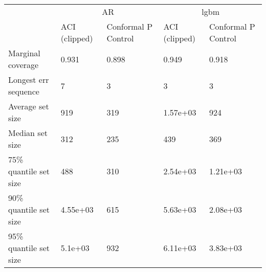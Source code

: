 \begin{tabular}{lllll}
\toprule
& \multicolumn{2}{c}{AR}& \multicolumn{2}{c}{lgbm} \\
& ACI (clipped) & Conformal P Control & ACI (clipped) & Conformal P Control \\
\midrule
Marginal coverage & 0.931 & 0.898 & 0.949 & 0.918 \\
Longest err sequence & 7 & 3 & 3 & 3 \\
Average set size & 919 & 319 & 1.57e+03 & 924 \\
Median set size & 312 & 235 & 439 & 369 \\
75\% quantile set size & 488 & 310 & 2.54e+03 & 1.21e+03 \\
90\% quantile set size & 4.55e+03 & 615 & 5.63e+03 & 2.08e+03 \\
95\% quantile set size & 5.1e+03 & 932 & 6.11e+03 & 3.83e+03 \\
\bottomrule
\end{tabular}
